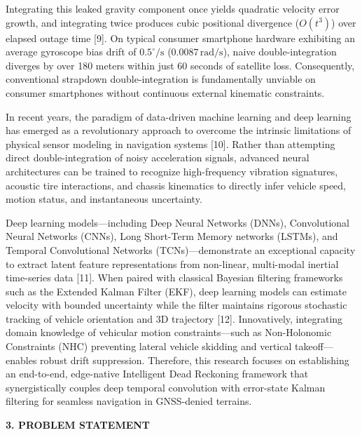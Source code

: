 \documentclass[11pt,a4paper]{article}
\begin{document}
Integrating this leaked gravity component once yields quadratic velocity error growth, and integrating twice produces cubic positional divergence ($O(t^3)$) over elapsed outage time [9]. On typical consumer smartphone hardware exhibiting an average gyroscope bias drift of $0.5^\circ/\text{s}$ ($0.0087\,\text{rad/s}$), naive double-integration diverges by over 180 meters within just 60 seconds of satellite loss. Consequently, conventional strapdown double-integration is fundamentally unviable on consumer smartphones without continuous external kinematic constraints.

In recent years, the paradigm of data-driven machine learning and deep learning has emerged as a revolutionary approach to overcome the intrinsic limitations of physical sensor modeling in navigation systems [10]. Rather than attempting direct double-integration of noisy acceleration signals, advanced neural architectures can be trained to recognize high-frequency vibration signatures, acoustic tire interactions, and chassis kinematics to directly infer vehicle speed, motion status, and instantaneous uncertainty.
\newpage

Deep learning models—including Deep Neural Networks (DNNs), Convolutional Neural Networks (CNNs), Long Short-Term Memory networks (LSTMs), and Temporal Convolutional Networks (TCNs)—demonstrate an exceptional capacity to extract latent feature representations from non-linear, multi-modal inertial time-series data [11]. When paired with classical Bayesian filtering frameworks such as the Extended Kalman Filter (EKF), deep learning models can estimate velocity with bounded uncertainty while the filter maintains rigorous stochastic tracking of vehicle orientation and 3D trajectory [12]. Innovatively, integrating domain knowledge of vehicular motion constraints—such as Non-Holonomic Constraints (NHC) preventing lateral vehicle skidding and vertical takeoff—enables robust drift suppression. Therefore, this research focuses on establishing an end-to-end, edge-native Intelligent Dead Reckoning framework that synergistically couples deep temporal convolution with error-state Kalman filtering for seamless navigation in GNSS-denied terrains.

\vspace{0.35cm}
\begin{center}
{\large \textbf{3. PROBLEM STATEMENT}}
\end{center}
\end{document}
